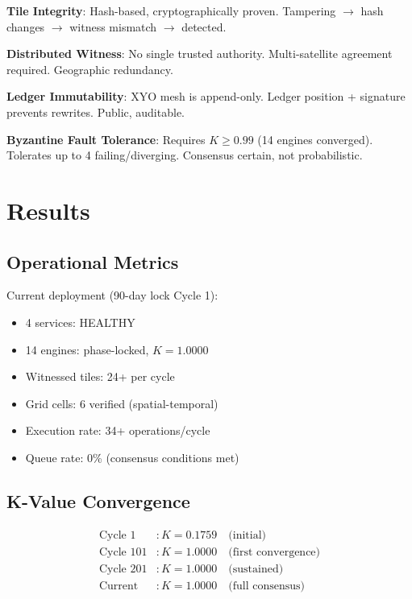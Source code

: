 \documentclass[11pt]{article}
\begin{document}
\textbf{Tile Integrity}: Hash-based, cryptographically proven. Tampering $\rightarrow$ hash changes $\rightarrow$ witness mismatch $\rightarrow$ detected.

\textbf{Distributed Witness}: No single trusted authority. Multi-satellite agreement required. Geographic redundancy.

\textbf{Ledger Immutability}: XYO mesh is append-only. Ledger position + signature prevents rewrites. Public, auditable.

\textbf{Byzantine Fault Tolerance}: Requires $K \geq 0.99$ (14 engines converged). Tolerates up to 4 failing/diverging. Consensus certain, not probabilistic.

\section{Results}

\subsection{Operational Metrics}

Current deployment (90-day lock Cycle 1):
\begin{itemize}
    \item 4 services: HEALTHY
    \item 14 engines: phase-locked, $K = 1.0000$
    \item Witnessed tiles: 24+ per cycle
    \item Grid cells: 6 verified (spatial-temporal)
    \item Execution rate: 34+ operations/cycle
    \item Queue rate: 0\% (consensus conditions met)
\end{itemize}

\subsection{K-Value Convergence}

\begin{align}
\text{Cycle 1} &: K = 0.1759 \quad \text{(initial)} \\
\text{Cycle 101} &: K = 1.0000 \quad \text{(first convergence)} \\
\text{Cycle 201} &: K = 1.0000 \quad \text{(sustained)} \\
\text{Current} &: K = 1.0000 \quad \text{(full consensus)}
\end{align}
\end{document}
